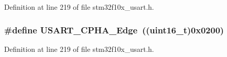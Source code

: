 Definition at line 219 of file stm32f10x\+\_\+usart.\+h.

\subsubsection[{\texorpdfstring{U\+S\+A\+R\+T\+\_\+\+C\+P\+H\+A\+\_\+2\+Edge}{USART_CPHA_2Edge}}]{\setlength{\rightskip}{0pt plus 5cm}\#define U\+S\+A\+R\+T\+\_\+\+C\+P\+H\+A\+\_\+Edge~(({\bf uint16\+\_\+t})0x0200)}\hypertarget{group___u_s_a_r_t___clock___phase_ga66344d0725f1300e9d0f8f1708111f25}{}\label{group___u_s_a_r_t___clock___phase_ga66344d0725f1300e9d0f8f1708111f25}


Definition at line 219 of file stm32f10x\+\_\+usart.\+h.


